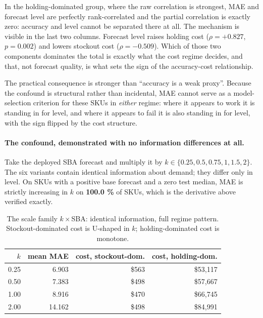 \documentclass[11pt]{article}
\begin{document}
In the holding-dominated group, where the raw correlation is strongest, MAE and
forecast level are perfectly rank-correlated and the partial correlation is
exactly zero: accuracy and level cannot be separated there at all. The
mechanism is visible in the last two columns. Forecast level raises holding
cost ($\rho = +0.827$, $p = 0.002$) and lowers stockout cost ($\rho = -0.509$).
Which of those two components dominates the total is exactly what the cost
regime decides, and that, not forecast quality, is what sets the sign of the
accuracy-cost relationship.

The practical consequence is stronger than ``accuracy is a weak proxy''.
Because the confound is structural rather than incidental, MAE cannot serve as
a model-selection criterion for these SKUs in \emph{either} regime: where it
appears to work it is standing in for level, and where it appears to fail it is
also standing in for level, with the sign flipped by the cost structure.

\paragraph{The confound, demonstrated with no information differences at all.}
Take the deployed SBA forecast and multiply it by
$k \in \{0.25, 0.5, 0.75, 1, 1.5, 2\}$. The six variants contain identical
information about demand; they differ only in level. On SKUs with a positive
base forecast and a zero test median, MAE is strictly increasing in $k$ on
\textbf{100.0 \%} of SKUs, which is the derivative above verified exactly.

\begin{table}[htbp]
\centering
\caption{The scale family $k\times$SBA: identical information, full regime
pattern. Stockout-dominated cost is U-shaped in $k$; holding-dominated cost is
monotone.}
\label{tab:scalefam}
\begin{tabular}{rrrr}
\toprule
$k$ & mean MAE & cost, stockout-dom. & cost, holding-dom. \\
\midrule
0.25 & 6.903  & \$563 & \$53{,}117 \\
0.50 & 7.383  & \$498 & \$57{,}667 \\
1.00 & 8.916  & \$470 & \$66{,}745 \\
2.00 & 14.162 & \$498 & \$84{,}991 \\
\bottomrule
\end{tabular}
\end{table}
\end{document}
